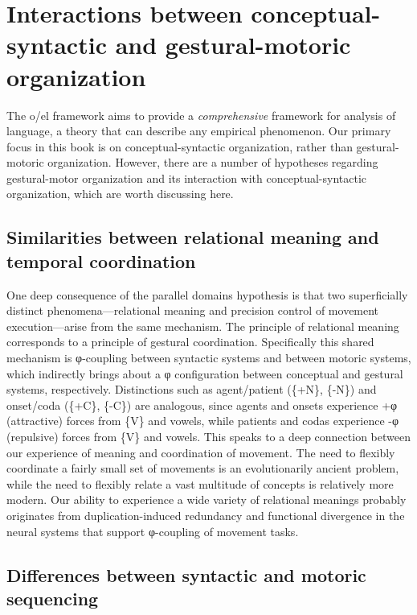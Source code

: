 \section{Interactions between conceptual-syntactic and gestural-motoric organization}

The o/el framework aims to provide a \textit{comprehensive} framework for analysis of language, a theory that can describe any empirical phenomenon. Our primary focus in this book is on conceptual-syntactic organization, rather than gestural-motoric organization. However, there are a number of hypotheses regarding gestural-motor organization and its interaction with conceptual-syntactic organization, which are worth discussing here.

\subsection{Similarities between relational meaning and temporal coordination}

One deep consequence of the parallel domains hypothesis is that two superficially distinct phenomena—relational meaning and precision control of movement execution—arise from the same mechanism. The principle of relational meaning corresponds to a principle of gestural coordination. Specifically this shared mechanism is φ-coupling between syntactic systems and between motoric systems, which indirectly brings about a φ configuration between conceptual and gestural systems, respectively. Distinctions such as agent/patient (\{+N\}, \{-N\}) and onset/coda (\{+C\}, \{-C\}) are analogous, since agents and onsets experience +φ (attractive) forces from \{V\} and vowels, while patients and codas experience -φ (repulsive) forces from \{V\} and vowels. This speaks to a deep connection between our experience of meaning and coordination of movement. The need to flexibly coordinate a fairly small set of movements is an evolutionarily ancient problem, while the need to flexibly relate a vast multitude of concepts is relatively more modern. Our ability to experience a wide variety of relational meanings probably originates from duplication-induced redundancy and functional divergence in the neural systems that support φ-coupling of movement tasks. 

\subsection{Differences between syntactic and motoric sequencing} 

